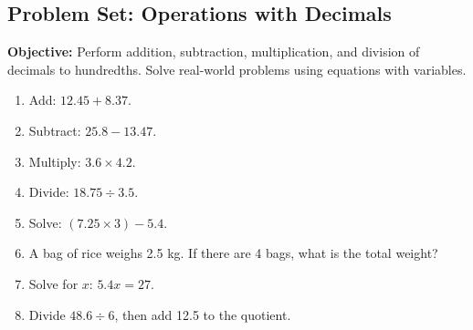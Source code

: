 \documentclass[12pt]{article}
\title{}
\date{}
\begin{document}
\subsection*{Problem Set: Operations with Decimals}
\onehalfspacing

\begin{tcolorbox}[colframe=black!40, colback=gray!5, 
coltitle=black, colbacktitle=black!20, fonttitle=\bfseries\Large, 
title=Learning Objective, halign title=center, left=5pt, right=5pt, top=5pt, bottom=15pt]
\textbf{Objective:} Perform addition, subtraction, multiplication, and division of decimals to hundredths. Solve real-world problems using equations with variables.
\end{tcolorbox}

\begin{tcolorbox}[colframe=black!60, colback=white, 
coltitle=black, colbacktitle=black!15, fonttitle=\bfseries\Large, 
title=Exercises, halign title=center, left=10pt, right=10pt, top=10pt, bottom=60pt]
\begin{enumerate}[itemsep=3.5em]
    \item Add: \( 12.45 + 8.37 \).
    \item Subtract: \( 25.8 - 13.47 \).
    \item Multiply: \( 3.6 \times 4.2 \).
    \item Divide: \( 18.75 \div 3.5 \).
    \item Solve: \( (7.25 \times 3) - 5.4 \).
    \item A bag of rice weighs 2.5 kg. If there are 4 bags, what is the total weight?
    \item Solve for \( x \): \( 5.4x = 27 \).
    \item Divide \( 48.6 \div 6 \), then add 12.5 to the quotient.
\end{enumerate}
\end{tcolorbox}

\vspace{1em}
\end{document}
